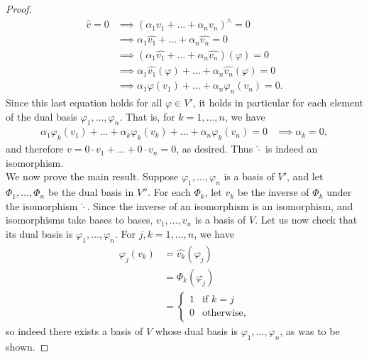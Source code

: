 \documentclass[11pt]{extarticle}
\begin{document}
\begin{proof}
\begin{align*}
\hat{v} = 0 &\implies (\alpha_1v_1+\dots+\alpha_nv_n)^\wedge = 0\\
 &\implies \alpha_1\widehat{v_1} + \dots + \alpha_n\widehat{v_n} = 0\\
 &\implies (\alpha_1\widehat{v_1} + \dots + \alpha_n\widehat{v_n})(\varphi) = 0\\
 &\implies \alpha_1\widehat{v_1}(\varphi) + \dots + \alpha_n\widehat{v_n}(\varphi) = 0\\
 &\implies \alpha_1\varphi(v_1) + \dots + \alpha_n\varphi_n(v_n) = 0. 
\end{align*}
Since this last equation holds for all $\varphi\in V'$, it holds in particular for each element of the dual basis $\varphi_1,\dots, \varphi_n$.  That is, for $k= 1,\dots,n$, we have
\begin{align*}
\alpha_1\varphi_k(v_1) + \dots + \alpha_k\varphi_k(v_k) + \dots + \alpha_n\varphi_k(v_n) = 0 &\implies \alpha_k = 0,
\end{align*}
and therefore $v= 0\cdot v_1+\dots + 0\cdot v_n = 0$, as desired.  Thus $\hat{\cdot}$ is indeed an isomorphism.\\
\indent We now prove the main result.  Suppose $\varphi_1,\dots, \varphi_n$ is a basis of $V'$, and let $\Phi_1,\dots,\Phi_n$ be the dual basis in $V''$.  For each $\Phi_k$, let $v_k$ be the inverse of $\Phi_k$ under the isomorphism $\hat{\cdot}$.  Since the inverse of an isomorphism is an isomorphism, and isomorphisms take bases to bases, $v_1,\dots, v_n$ is a basis of $V$.  Let us now check that its dual basis is $\varphi_1,\dots,\varphi_n$.  For $j,k = 1,\dots, n$, we have
\begin{align*}
\varphi_j(v_k) &= \widehat{v_k}(\varphi_j)\\
&= \Phi_k(\varphi_j)\\
&=\begin{cases}1 &\text{if }k = j\\ 0&\text{otherwise,}\end{cases}
\end{align*}
so indeed there exists a basis of $V$ whose dual basis is $\varphi_1,\dots, \varphi_n$, as was to be shown.
\end{proof}
\end{document}
